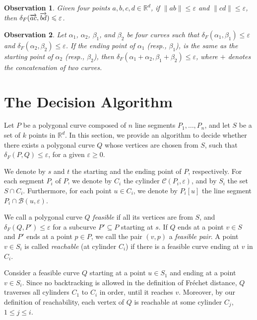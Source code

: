 \documentclass[12pt]{dalthesis}
\newtheorem{obs}{Observation}
\newcommand{\IR}{\ensuremath{\mathbb{R}}}
\newcommand{\lee}{\leqslant}
\newcommand{\gee}{\geqslant}
\newcommand{\eps}{\varepsilon}
\newcommand{\CB}{{\mathscr B}}
\newcommand{\CC}{{\mathscr C}}
\newcommand{\Frechet}{Fr\'echet }
\newcommand{\distF}{\delta_F}
\begin{document}
\begin{obs}\label{obs:simple}
	Given four points $a, b,c,d \in \IR^d$, if
	$\| ab\| \lee \eps$ and $\| cd\| \lee \eps$, then
	$\distF(\Dir{ac},\Dir{bd}) \lee \eps$. 
\end{obs}

\begin{obs}\label{obs:concat}
	Let $\alpha_1$, $\alpha_2$, $\beta_1$, and $\beta_2$ 
	be four curves 
	such that $\distF(\alpha_1,\beta_1) \lee \eps$ and
	$\distF(\alpha_2,\beta_2) \lee \eps$. 
	If the ending point of $\alpha_1$ (resp., $\beta_1$), 
	is the same as 
	the starting point of $\alpha_2$  (resp., $\beta_2$),
	then $\distF(\alpha_1 + \alpha_2, \beta_1 + \beta_2) \lee \eps$,
	where $+$ denotes the concatenation of two curves.
\end{obs}




\section{The Decision Algorithm}

Let $P$ be a polygonal curve composed of $n$ line segments $P_1, \ldots, P_n$,
and let $S$ be a set of $k$ points in $\IR^d$.
In this section, we provide an algorithm to
decide whether there exists a polygonal curve $Q$ whose vertices are chosen from $S$,
such that $\distF(P,Q) \lee \eps$,
for a given $\eps \gee 0$. 

We denote by $s$ and $t$ the starting and the ending point of $P$, respectively.
For each segment $P_i$ of $P$,
we denote by $C_i$ the cylinder $\CC(P_i, \eps)$,
and by $S_i$ the set $S \cap C_i$.
Furthermore, for each point $u \in C_i$,
we denote by $P_i[u]$ the line segment $P_i \cap \CB(u,\eps)$.

We call a polygonal curve $Q$ \emph{feasible} if 
all its vertices are from $S$, and
$\distF(Q, P') \lee \eps$ for a subcurve $P' \subseteq P$ starting at $s$.
If $Q$ ends at a point $v \in S$ and $P'$ ends at a point $p \in P$, 
we call the pair $(v,p)$ a \emph{feasible pair}.
A point $v \in S_i$ is called \emph{reachable} (at cylinder $C_i$)
if there is a feasible curve ending at $v$ in $C_i$.

Consider a feasible curve $Q$ starting at a point $u \in S_1$ and
ending at a point $v \in S_i$.
Since no backtracking is allowed in the definition of \Frechet distance,
$Q$ traverses all cylinders $C_1$ to $C_i$ in order, until it reaches $v$.
Moreover, by our definition of reachability, 
each vertex of $Q$ is reachable at some cylinder $C_j$, $1 \lee j \lee i$.
\end{document}
